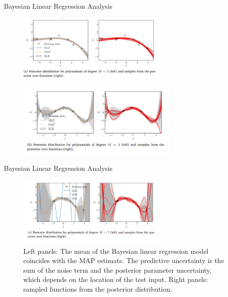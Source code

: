 \documentclass{beamer}
\begin{document}
\begin{frame}{Bayesian Linear Regression Analysis}

\begin{figure}[htp]
\centering
\includegraphics[width=7.5cm]{figures/blr21.png}
\label{fig:blrfig21}
\end{figure}
\begin{figure}[htp]
\centering
\includegraphics[width=8cm]{figures/blr22.png}
\label{fig:blrfig22}
\end{figure}

\end{frame}

\begin{frame}{Bayesian Linear Regression Analysis}

\begin{figure}[htp]
\centering
\includegraphics[width=7.5cm]{figures/blr23.png}
\caption{ Left
panels: The mean of the
Bayesian linear
regression model
coincides with the
MAP estimate. The
predictive
uncertainty is the
sum of the noise
term and the
posterior parameter
uncertainty, which
depends on the
location of the test
input. Right panels:
sampled functions
from the posterior
distribution.}
\label{fig:blrfig23}
\end{figure}

\end{frame}
\end{document}
